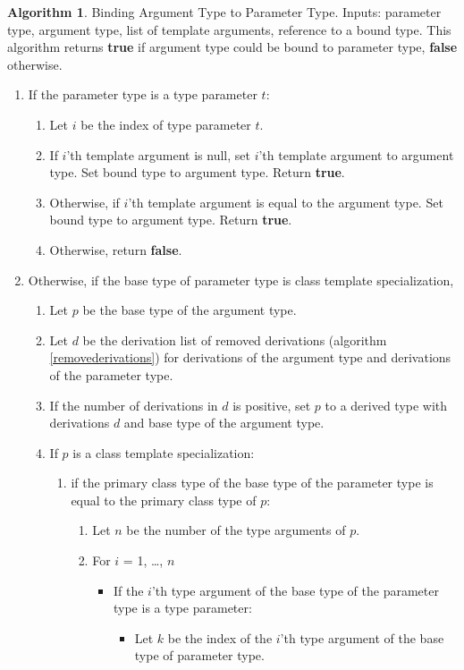 \documentclass[a4paper,oneside,11pt]{book}
\theoremstyle{definition}
\newtheorem{algo}{Algorithm}[section]
\begin{document}
\begin{algo}\label{bindtype} Binding Argument Type to Parameter Type. Inputs: parameter type, argument type, list of template arguments, reference to a bound type.
This algorithm returns \textbf{true} if argument type could be bound to parameter type, \textbf{false} otherwise.
\begin{enumerate}
\item
If the parameter type is a type parameter $t$:
\begin{enumerate}
\item
Let $i$ be the index of type parameter $t$.
\item
If $i$'th template argument is null, set $i$'th template argument to argument type. Set bound type to argument type. Return \textbf{true}.
\item
Otherwise, if $i$'th template argument is equal to the argument type. Set bound type to argument type. Return \textbf{true}.
\item
Otherwise, return \textbf{false}.
\end{enumerate}
\item
Otherwise, if the base type of parameter type is class template specialization,
\begin{enumerate}
\item
Let $p$ be the base type of the argument type.
\item
Let $d$ be the derivation list of removed derivations (algorithm \ref{removederivations})
for derivations of the argument type and derivations of the parameter type.
\item
If the number of derivations in $d$ is positive, set $p$ to a derived type with derivations $d$ and base type of the argument type.
\item
If $p$ is a class template specialization:
\begin{enumerate}
\item
if the primary class type of the base type of the parameter type is equal to the primary class type of $p$:
\begin{enumerate}
\item
Let $n$ be the number of the type arguments of $p$.
\item
For $i$ = 1, \ldots, $n$
\begin{itemize}
\item
If the $i$'th type argument of the base type of the parameter type is a type parameter:
\begin{itemize}
\item
Let $k$ be the index of the $i$'th type argument of the base type of parameter type.

\end{itemize}
\end{itemize}
\end{enumerate}
\end{enumerate}
\end{enumerate}
\end{enumerate}
\end{algo}
\end{document}

